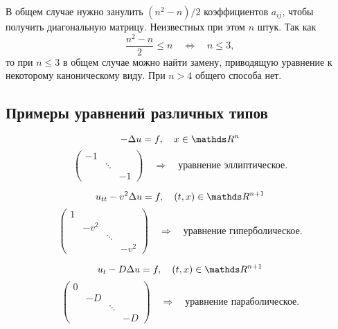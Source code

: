В общем случае нужно занулить $(n^2 - n) / 2$ коэффициентов $a_{ij}$, чтобы получить диагональную матрицу. Неизвестных при этом $n$ штук. Так как
$$\frac {n^2 - n} {2} \leq n \quad \Longleftrightarrow \quad n \leq 3,$$
то при $n \leq 3$ в общем случае можно найти замену, приводящую уравнение к некоторому каноническому виду. При $n > 4$ общего способа нет.

\subsection{Примеры уравнений различных типов}

\begin{example}
$$ - \Delta u = f, \quad x \in \real^n$$
$$\begin{pmatrix}
-1 & \\
   & \ddots \\
   & & -1
\end{pmatrix}\quad \Rightarrow \quad \text{уравнение эллиптическое}.$$
\end{example}

\begin{example}
$$u_{tt} - v^2 \Delta u = f, \quad (t,x) \in \real^{n+1}$$
$$\begin{pmatrix}
1 & \\
   & -v^2 \\
   & & \ddots \\
   & & & -v^2
\end{pmatrix}\quad \Rightarrow \quad \text{уравнение гиперболическое}.$$
\end{example}

\begin{example}
$$ u_t - D \Delta u = f, \quad (t,x) \in \real^{n+1}$$
$$\begin{pmatrix}
0 & \\
   & -D \\
   & & \ddots \\
   & & & -D
\end{pmatrix}\quad \Rightarrow \quad \text{уравнение параболическое}.$$
\end{example}